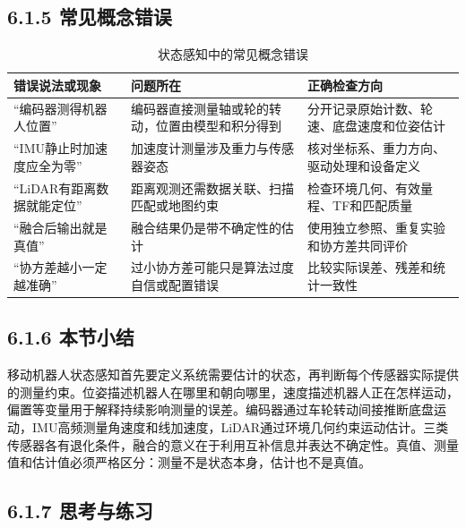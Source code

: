 \documentclass[UTF8,zihao=-4]{ctexart}
\begin{document}
\subsection*{6.1.5 常见概念错误}

\begin{table}[htbp]
  \centering
  \caption{状态感知中的常见概念错误}
  \begin{tabular}{p{}p{}p{}}
    \toprule
    错误说法或现象 & 问题所在 & 正确检查方向 \\
    \midrule
    “编码器测得机器人位置” & 编码器直接测量轴或轮的转动，位置由模型和积分得到 & 分开记录原始计数、轮速、底盘速度和位姿估计 \\
    “IMU静止时加速度应全为零” & 加速度计测量涉及重力与传感器姿态 & 核对坐标系、重力方向、驱动处理和设备定义 \\
    “LiDAR有距离数据就能定位” & 距离观测还需数据关联、扫描匹配或地图约束 & 检查环境几何、有效量程、TF和匹配质量 \\
    “融合后输出就是真值” & 融合结果仍是带不确定性的估计 & 使用独立参照、重复实验和协方差共同评价 \\
    “协方差越小一定越准确” & 过小协方差可能只是算法过度自信或配置错误 & 比较实际误差、残差和统计一致性 \\
    \bottomrule
  \end{tabular}
\end{table}

\subsection*{6.1.6 本节小结}

移动机器人状态感知首先要定义系统需要估计的状态，再判断每个传感器实际提供的测量约束。位姿描述机器人在哪里和朝向哪里，速度描述机器人正在怎样运动，偏置等变量用于解释持续影响测量的误差。编码器通过车轮转动间接推断底盘运动，IMU高频测量角速度和线加速度，LiDAR通过环境几何约束运动估计。三类传感器各有退化条件，融合的意义在于利用互补信息并表达不确定性。真值、测量值和估计值必须严格区分：测量不是状态本身，估计也不是真值。

\subsection*{6.1.7 思考与练习}
\end{document}
